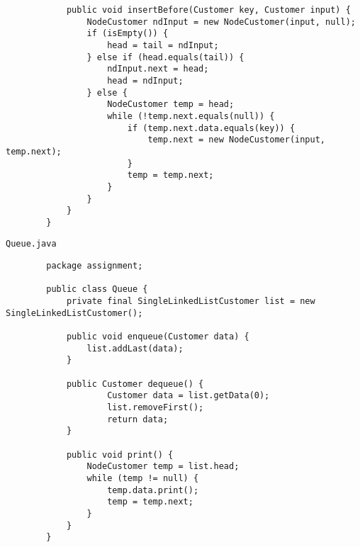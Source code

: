 \documentclass[12pt,titlepage]{article}
\begin{document}
\begin{enumerate}
\begin{verbatim}
            public void insertBefore(Customer key, Customer input) {
                NodeCustomer ndInput = new NodeCustomer(input, null);
                if (isEmpty()) {
                    head = tail = ndInput;
                } else if (head.equals(tail)) {
                    ndInput.next = head;
                    head = ndInput;
                } else {
                    NodeCustomer temp = head;
                    while (!temp.next.equals(null)) {
                        if (temp.next.data.equals(key)) {
                            temp.next = new NodeCustomer(input, temp.next);
                        }
                        temp = temp.next;
                    }
                }
            }
        }
    \end{verbatim}
    \texttt{Queue.java}
    \begin{verbatim}
        package assignment;

        public class Queue {
            private final SingleLinkedListCustomer list = new SingleLinkedListCustomer();

            public void enqueue(Customer data) {
                list.addLast(data);
            }

            public Customer dequeue() {
                    Customer data = list.getData(0);
                    list.removeFirst();
                    return data;
            }

            public void print() {
                NodeCustomer temp = list.head;
                while (temp != null) {
                    temp.data.print();
                    temp = temp.next;
                }
            }
        }
    \end{verbatim}
\end{enumerate}
\end{document}
